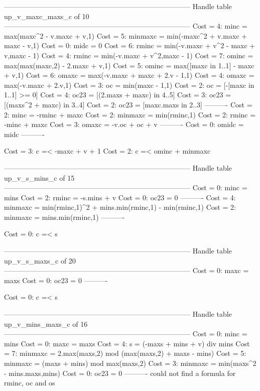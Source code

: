 --------------------------------------------------------------------------------
Handle table up_v_maxc_maxs_c of 10
--------------------------------------------------------------------------------
Cost =  4:  minc    = max(maxc^2 - v.maxc + v,1)
Cost =  5:  minmaxc = min(-maxc^2 + v.maxc + maxc - v,1)
Cost =  0:  midc    = 0
Cost =  6:  rminc   = min(-v.maxc + v^2 - maxc + v,maxc - 1)
Cost =  4:  rminc   = min(-v.maxc + v^2,maxc - 1)
Cost =  7:  ominc   = max(max(maxc,2) - 2.maxc + v,1)
Cost =  5:  ominc   = max([maxc in 1..1] - maxc + v,1)
Cost =  6:  omaxc   = max(-v.maxc + maxc + 2.v - 1,1)
Cost =  4:  omaxc   = max(-v.maxc + 2.v,1)
Cost =  3:  oc      = min(maxc - 1,1)
Cost =  2:  oc      = [-[maxc in 1..1] >= 0]
Cost =  4:  oc23    = [(2.maxs + maxc) in 4..5]
Cost =  3:  oc23    = [(maxs^2 + maxc) in 3..4]
Cost =  2:  oc23    = [maxc.maxs in 2..3]
----------
Cost =  2:  minc    = -rminc + maxc
Cost =  2:  minmaxc = min(rminc,1)
Cost =  2:  rminc   = -minc + maxc
Cost =  3:  omaxc   = -v.oc + oc + v
----------
Cost =  0:  omidc   = midc
----------

Cost =  3:  c =< -maxc + v + 1
Cost =  2:  c =< ominc + minmaxc

--------------------------------------------------------------------------------
Handle table up_v_s_mins_c of 15
--------------------------------------------------------------------------------
Cost =  0:  minc    = mins
Cost =  2:  rminc   = -s.mins + v
Cost =  0:  oc23    = 0
----------
Cost =  4:  minmaxc = min(rminc,1)^2 + mins.min(rminc,1) - min(rminc,1)
Cost =  2:  minmaxc = mins.min(rminc,1)
----------

Cost =  0:  c =< s

--------------------------------------------------------------------------------
Handle table up_v_s_maxs_c of 20
--------------------------------------------------------------------------------
Cost =  0:  maxc = maxs
Cost =  0:  oc23 = 0
----------

Cost =  0:  c =< s

--------------------------------------------------------------------------------
Handle table up_v_mins_maxs_c of 16
--------------------------------------------------------------------------------
Cost =  0:  minc    = mins
Cost =  0:  maxc    = maxs
Cost =  4:  s       = (-maxs + mins + v) div mins
Cost =  7:  minmaxc = 2.max(maxs,2) mod (max(maxs,2) + maxs - mins)
Cost =  5:  minmaxc = (maxs + mins) mod max(maxs,2)
Cost =  3:  minmaxc = min(maxs^2 - mins.maxs,mins)
Cost =  0:  oc23    = 0
----------
could not find a formula for rminc, oc and os

